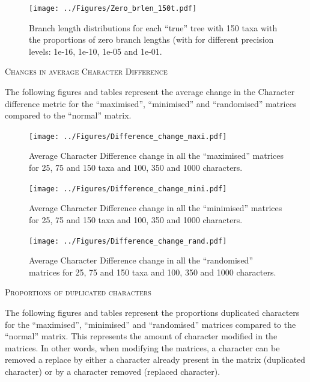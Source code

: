 \documentclass[12pt,letterpaper]{article}
\renewcommand{\section}[1]{%
\bigskip
\begin{center}
\begin{Large}
\normalfont\scshape #1
\medskip
\end{Large}
\end{center}}
\begin{document}
\begin{figure}[!htbp]
\centering
   \texttt{[image: ../Figures/Zero\_brlen\_150t.pdf]}
\caption{Branch length distributions for each ``true'' tree with 150 taxa with the proportions of zero branch lengths (with for different precision levels: 1e-16, 1e-10, 1e-05 and 1e-01.}
\end{figure}

\newpage

\section{Changes in average Character Difference}

The following figures and tables represent the average change in the Character difference metric for the ``maximised'', ``minimised'' and ``randomised'' matrices compared to the ``normal'' matrix.

\begin{figure}[!htbp]
\centering
   \texttt{[image: ../Figures/Difference\_change\_maxi.pdf]}
\caption{Average Character Difference change in all the ``maximised'' matrices for 25, 75 and 150 taxa and 100, 350 and 1000 characters.}
\end{figure}

\begin{figure}[!htbp]
\centering
   \texttt{[image: ../Figures/Difference\_change\_mini.pdf]}
\caption{Average Character Difference change in all the ``minimised'' matrices for 25, 75 and 150 taxa and 100, 350 and 1000 characters.}
\end{figure}

\begin{figure}[!htbp]
\centering
   \texttt{[image: ../Figures/Difference\_change\_rand.pdf]}
\caption{Average Character Difference change in all the ``randomised'' matrices for 25, 75 and 150 taxa and 100, 350 and 1000 characters.}
\end{figure}




\newpage

\section{Proportions of duplicated characters}

The following figures and tables represent the proportions duplicated characters for the ``maximised'', ``minimised'' and ``randomised'' matrices compared to the ``normal'' matrix. This represents the amount of character modified in the matrices. In other words, when modifying the matrices, a character can be removed a replace by either a character already present in the matrix (duplicated character) or by a character removed (replaced character).
\end{document}
